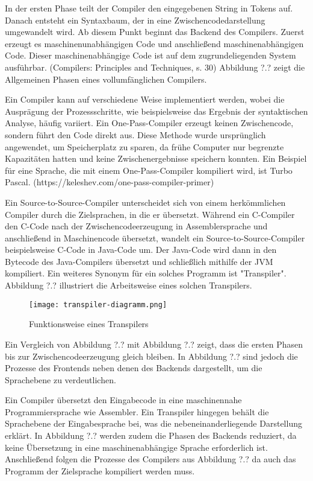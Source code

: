 In der ersten Phase teilt der Compiler den eingegebenen String in Tokens auf. Danach entsteht ein Syntaxbaum, der in eine Zwischencodedarstellung umgewandelt wird. Ab diesem Punkt beginnt das Backend des Compilers. Zuerst erzeugt es maschinenunabhängigen Code und anschließend maschinenabhängigen Code. Dieser maschinenabhängige Code ist auf dem zugrundeliegenden System ausführbar. (Compilers: Principles and Techniques, s. 30) 
Abbildung ?.? zeigt die Allgemeinen Phasen eines vollumfänglichen Compilers. 

Ein Compiler kann auf verschiedene Weise implementiert werden, wobei die Ausprägung der Prozessschritte, wie beispielsweise das Ergebnis der syntaktischen Analyse, häufig variiert. Ein One-Pass-Compiler erzeugt keinen Zwischencode, sondern führt den Code direkt aus. Diese Methode wurde ursprünglich angewendet, um Speicherplatz zu sparen, da frühe Computer nur begrenzte Kapazitäten hatten und keine Zwischenergebnisse speichern konnten. Ein Beispiel für eine Sprache, die mit einem One-Pass-Compiler kompiliert wird, ist Turbo Pascal. (https://keleshev.com/one-pass-compiler-primer)

Ein Source-to-Source-Compiler unterscheidet sich von einem herkömmlichen Compiler durch die Zielsprachen, in die er übersetzt. Während ein C-Compiler den C-Code nach der Zwischencodeerzeugung in Assemblersprache und anschließend in Maschinencode übersetzt, wandelt ein Source-to-Source-Compiler beispielsweise C-Code in Java-Code um. Der Java-Code wird dann in den Bytecode des Java-Compilers übersetzt und schließlich mithilfe der JVM kompiliert. Ein weiteres Synonym für ein solches Programm ist "Transpiler". Abbildung ?.? illustriert die Arbeitsweise eines solchen Transpilers.
\pagebreak
\begin{figure}[h]
  \centering
  \caption{Funktionsweise eines Transpilers}
  \texttt{[image: transpiler-diagramm.png]}
  \label{fig:transpiler}
\end{figure}
\pagebreak
Ein Vergleich von Abbildung ?.? mit Abbildung ?.? zeigt, dass die ersten Phasen bis zur Zwischencodeerzeugung gleich bleiben. In Abbildung ?.? sind jedoch die Prozesse des Frontends neben denen des Backends dargestellt, um die Sprachebene zu verdeutlichen.

Ein Compiler übersetzt den Eingabecode in eine maschinennahe Programmiersprache wie Assembler. Ein Transpiler hingegen behält die Sprachebene der Eingabesprache bei, was die nebeneinanderliegende Darstellung erklärt. In Abbildung ?.? werden zudem die Phasen des Backends reduziert, da keine Übersetzung in eine maschinenabhängige Sprache erforderlich ist. Anschließend folgen die Prozesse des Compilers aus Abbildung ?.? da auch das Programm der Zielsprache kompiliert werden muss.


